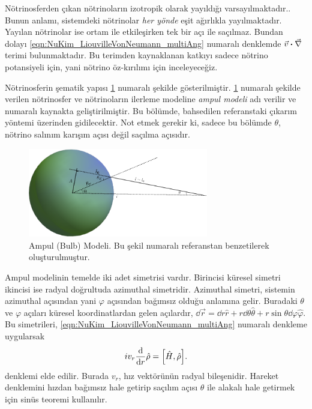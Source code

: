 Nötrinosferden çıkan nötrinoların izotropik olarak yayıldığı varsayılmaktadır.. Bunun anlamı, sistemdeki nötrinolar \emph{her yönde} eşit ağırlıkla yayılmaktadır. Yayılan nötrinolar ise ortam ile etkileşirken tek bir açı ile saçılmaz. Bundan dolayı \eqref{eqn:NuKim_LiouvilleVonNeumann_multiAng} numaralı denklemde $ \vec{v} \vdot \vec{\nabla} $ terimi bulunmaktadır. Bu terimden kaynaklanan katkıyı sadece nötrino potansiyeli için, yani nötrino öz-kırılımı için inceleyeceğiz.

Nötrinosferin şematik yapısı \ref{fig:BulbModel} numaralı şekilde gösterilmiştir. \ref{fig:BulbModel} numaralı şekilde verilen nötrinosfer ve nötrinoların ilerleme modeline \emph{ampul modeli} adı verilir ve \cite{Duan:2006an} numaralı kaynakta geliştirilmiştir. Bu bölümde, bahsedilen referanstaki çıkarım yöntemi üzerinden gidilecektir. Not etmek gerekir ki, sadece bu bölümde $ \theta $, nötrino salınım karışım açısı değil saçılma açısıdır.
\begin{figure}[hbt!]
    \centering
    \includegraphics[width=0.7\textwidth]{figures/BulbModel.png}
    \caption[Ampul (Bulb) Modeli.]{Ampul (Bulb) Modeli. Bu şekil \cite{Duan:2006an} numaralı referanstan benzetilerek oluşturulmuştur.}
    \label{fig:BulbModel}
\end{figure}
Ampul modelinin temelde iki adet simetrisi vardır. Birincisi küresel simetri ikincisi ise radyal doğrultuda azimuthal simetridir. Azimuthal simetri, sistemin azimuthal açısından yani $ \varphi $ açısından bağımsız olduğu anlamına gelir. Buradaki $ \theta $ ve $ \varphi $ açıları küresel koordinatlardan gelen açılardır, $ \dd{\vec{r}} = \dd{r} \hat{r} + r\dd{\theta} \hat{\theta} + r\sin\theta\dd{\varphi} \hat{\varphi}  $.  Bu simetrileri, \eqref{eqn:NuKim_LiouvilleVonNeumann_multiAng} numaralı denkleme uygularsak
\begin{equation}
    i v_{r} \dv{r}\hat{\rho} = \comm{\hat{H}}{\hat{\rho}} \text{.}
\end{equation}
denklemi elde edilir. Burada $ v_{r} $, hız vektörünün radyal bileşenidir. Hareket denklemini hızdan bağımsız hale getirip saçılım açısı $ \theta $ ile alakalı hale getirmek için sinüs teoremi kullanılır. 

